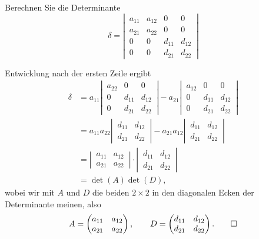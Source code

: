Berechnen Sie die Determinante
\[
\delta=\left|\,
\begin{matrix}
a_{11}&a_{12}&0     &0     \\
a_{21}&a_{22}&0     &0     \\
0     &0     &d_{11}&d_{12}\\
0     &0     &d_{21}&d_{22}
\end{matrix}
\,\right|
\]


\begin{loesung}
Entwicklung nach der ersten Zeile ergibt
\begin{align*}
\delta
&=
a_{11}\left|\,
\begin{matrix}
a_{22}&0     &0     \\
0     &d_{11}&d_{12}\\
0     &d_{21}&d_{22}
\end{matrix}
\,\right|
-
a_{21}
\left|\,
\begin{matrix}
a_{12}&0     &0     \\
0     &d_{11}&d_{12}\\
0     &d_{21}&d_{22}
\end{matrix}
\,\right|
\\
&=
a_{11}a_{22}\left|\,
\begin{matrix}
d_{11}&d_{12}\\
d_{21}&d_{22}
\end{matrix}
\,\right|
-
a_{21}a_{12}
\left|\,
\begin{matrix}
d_{11}&d_{12}\\
d_{21}&d_{22}
\end{matrix}
\,\right|
\\
&=
\left|\,
\begin{matrix}
a_{11}&a_{12}\\
a_{21}&a_{22}
\end{matrix}
\,\right|
\cdot
\left|\,
\begin{matrix}
d_{11}&d_{12}\\
d_{21}&d_{22}
\end{matrix}
\,\right|
\\
&=\det(A)\det(D),
\end{align*}
wobei wir mit $A$ und $D$ die beiden $2\times 2$ in den diagonalen Ecken
der Determinante meinen, also
\[
A=\begin{pmatrix}
a_{11}&a_{12}\\a_{21}&a_{22}
\end{pmatrix},\qquad
D=\begin{pmatrix}
d_{11}&d_{12}\\d_{21}&d_{22}
\end{pmatrix}.
\qedhere
\]
\end{loesung}

